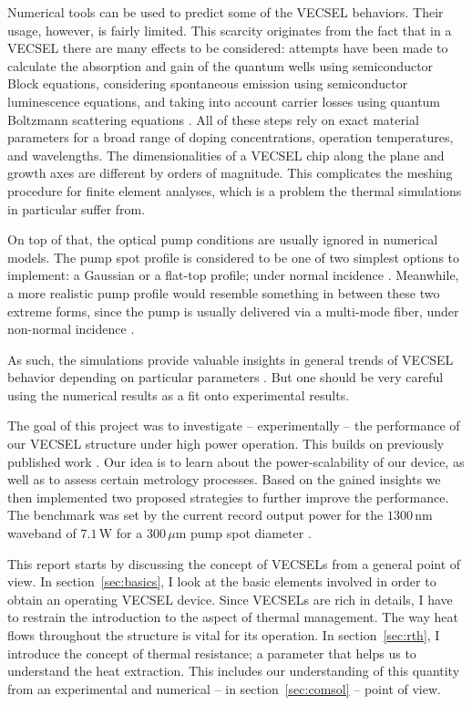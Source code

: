 Numerical tools
can be used
to predict some of
the VECSEL behaviors.
Their usage,
however,
is fairly limited.
This scarcity originates
from the fact that
in a VECSEL there are
many effects to be considered:
attempts have been made
to calculate the
absorption and gain of the quantum wells
using semiconductor Block equations,
considering spontaneous emission
using semiconductor luminescence equations,
and taking into account
carrier losses
using quantum Boltzmann scattering equations
\cite{Hader2011}.
All of these steps
rely on exact material parameters
for a broad range of
doping concentrations,
operation temperatures,
and wavelengths.
The dimensionalities
of a VECSEL chip
along the plane
and growth axes
are different by orders of magnitude.
This complicates
the meshing procedure
for finite element analyses,
which is a problem
the thermal simulations
in particular
suffer from. 

On top of that,
the optical pump conditions
are usually ignored
in numerical models.
The pump spot profile
is considered
to be one of two
simplest options to implement:
a Gaussian
or a flat-top profile;
under normal incidence
\cite{Ranta2014OptLett,Kemp2008,Hader2011,Kemp2005}.
Meanwhile,
a more realistic pump profile
would resemble something in between
these two extreme forms,
since the pump
is usually delivered
via a multi-mode fiber,
under non-normal incidence
\cite{Tropper2006,Chernikov2010,Heinen2012el}.

As such,
the simulations provide
valuable insights
in general trends
of VECSEL behavior
depending on particular parameters
\cite{Hader2011,Vetter2012}.
But one should be very careful
using the numerical results
as a fit
onto experimental results.

The goal of this project was
to investigate --
experimentally --
the performance
of our VECSEL structure
under high power operation.
This builds
on previously published work
\cite{Ranta2014OptLett,Sirbu2014OptExp}.
Our idea is to learn about
the power-scalability
of our device,
as well as to assess
certain metrology processes.
Based on the gained insights
we then implemented
two proposed strategies
\cite{Hader2011}
to further improve the performance.
The benchmark was set
by the current record output power
for the $1300\,\mathrm{nm}$ waveband
of $7.1\,\mathrm{W}$
for a $300\,\mu\mathrm{m}$ pump spot diameter
\cite{Sirbu2014OptExp}.

This report starts
by discussing
the concept of VECSELs
from a general point of view.
In section~\ref{sec:basics},
I look at
the basic elements involved
in order to obtain
an operating VECSEL device.
Since VECSELs
are rich in details,
I have to
restrain the introduction to 
the aspect of thermal management.
The way heat flows
throughout the structure
is vital for its operation.
In section~\ref{sec:rth},
I introduce
the concept of thermal resistance;
a parameter that helps us
to understand
the heat extraction.
This includes
our understanding of this quantity
from an experimental
and numerical --
in section~\ref{sec:comsol} --
point of view.

